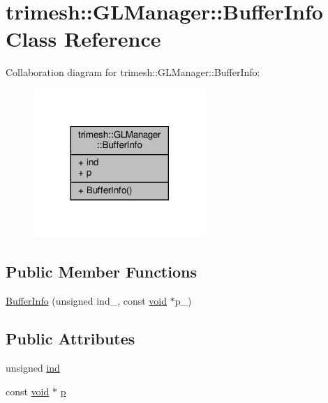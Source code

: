 \hypertarget{classtrimesh_1_1GLManager_1_1BufferInfo}{}\section{trimesh\+:\+:G\+L\+Manager\+:\+:Buffer\+Info Class Reference}
\label{classtrimesh_1_1GLManager_1_1BufferInfo}


Collaboration diagram for trimesh\+:\+:G\+L\+Manager\+:\+:Buffer\+Info\+:\nopagebreak
\begin{figure}[H]
\begin{center}
\leavevmode
\includegraphics[width=185pt]{d9/dca/classtrimesh_1_1GLManager_1_1BufferInfo__coll__graph}
\end{center}
\end{figure}
\subsection*{Public Member Functions}
\begin{DoxyCompactItemize}
\item 
\hyperlink{classtrimesh_1_1GLManager_1_1BufferInfo_ab381d4cc2e1b7a8ea5d7d50c6c1d48b1}{Buffer\+Info} (unsigned ind\+\_\+, const \hyperlink{namespacetrimesh_a784ddfd979e1c579bda795a8edfc3f43}{void} $\ast$p\+\_\+)
\end{DoxyCompactItemize}
\subsection*{Public Attributes}
\begin{DoxyCompactItemize}
\item 
unsigned \hyperlink{classtrimesh_1_1GLManager_1_1BufferInfo_a4a2777aeb5cdeada97a07db8eb4356ca}{ind}
\item 
const \hyperlink{namespacetrimesh_a784ddfd979e1c579bda795a8edfc3f43}{void} $\ast$ \hyperlink{classtrimesh_1_1GLManager_1_1BufferInfo_aaab05a6f7ef2421573cf5f58c3d52c19}{p}
\end{DoxyCompactItemize}


